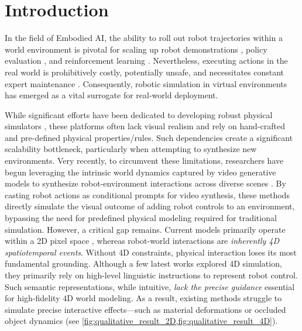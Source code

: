 \section{Introduction}
In the field of Embodied AI, the ability to roll out robot trajectories within a world environment is pivotal for scaling up robot demonstrations \cite{o2024open}, policy evaluation \cite{li2024evaluating,team2025evaluating}, and reinforcement learning \cite{ebert2018visual}. Nevertheless, executing actions in the real world is prohibitively costly, potentially unsafe, and necessitates constant expert maintenance \cite{brohan2022rt,khazatsky2024droid}. Consequently, robotic simulation in virtual environments has emerged as a vital surrogate for real-world deployment.

While significant efforts have been dedicated to developing robust physical simulators \cite{xiang2020sapien,makoviychuk2021isaac,mittal2023orbit,chen2024urdformer}, these platforms often lack visual realism and rely on hand-crafted and pre-defined physical properties/rules. Such dependencies create a significant scalability bottleneck, particularly when attempting to synthesize new environments. 
Very recently, to circumvent these limitations, researchers have begun leveraging the intrinsic world dynamics captured by video generative models to synthesize robot-environment interactions across diverse scenes \cite{zhu2025irasim,agarwal2025cosmos}.
By casting robot actions as conditional prompts for video synthesis, these methods directly simulate the visual outcome of adding robot controls to an environment, bypassing the need for predefined physical modeling required for traditional simulation.
However, a critical gap remains. Current models primarily operate within a 2D pixel space \cite{zhu2025irasim,agarwal2025cosmos}, whereas robot-world interactions are \textit{inherently 4D spatiotemporal events}. Without 4D constraints, physical interaction loses its most fundamental grounding. Although a few latest works  \cite{zhen2025tesseract,robo4dgen} explored 4D simulation, they primarily rely on high-level linguistic instructions to represent robot control. Such semantic representations, while intuitive, \textit{lack the precise guidance} essential for high-fidelity 4D world modeling.
As a result, existing methods struggle to simulate precise interactive effects—such as material deformations or occluded object dynamics (see \cref{fig:qualitative_result_2D,fig:qualitative_result_4D}).

